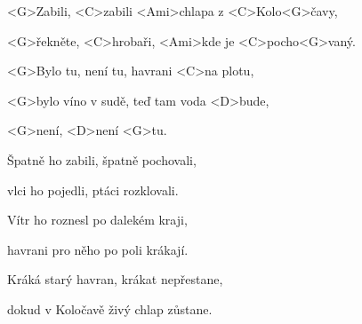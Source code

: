 

\zs
<G>Zabili, <C>zabili <Ami>chlapa z <C>Kolo<G>čavy,

<G>řekněte, <C>hrobaři, <Ami>kde je <C>pocho<G>vaný.
\ks

\zr
<G>Bylo tu, není tu, havrani <C>na plotu,

<G>bylo víno v sudě, teď tam voda <D>bude,

<G>není, <D>není <G>tu.
\kr

\zs
Špatně ho zabili, špatně pochovali,

vlci ho pojedli, ptáci rozklovali.
\ks

\zr
\kr

\zs
Vítr ho roznesl po dalekém kraji,

havrani pro něho po poli krákají.
\ks

\zr
\kr

\zs
Kráká starý havran, krákat nepřestane,

dokud v Koločavě živý chlap zůstane.
\ks

\zr\kr

\kp
